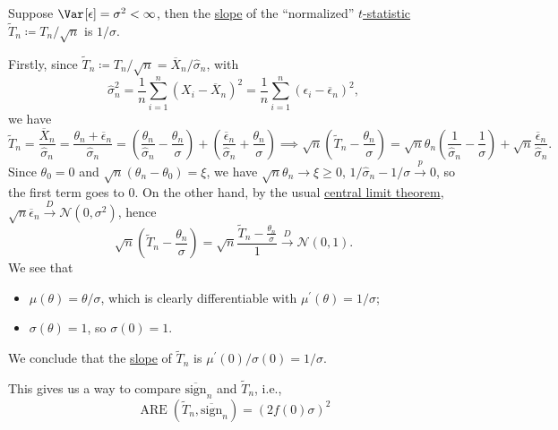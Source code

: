 \begin{eg}[\(t\)-test]
	Suppose \(\Var_{}[\epsilon ] = \sigma ^2 < \infty \), then the \hyperref[def:slope]{slope} of the ``normalized'' \hyperref[def:t-statistic]{\(t\)-statistic} \(\widetilde{T} _n \coloneqq T_n / \sqrt{n}\) is \(1 / \sigma \).
\end{eg}
\begin{explanation}
	Firstly, since \(\widetilde{T} _n \coloneqq T_n / \sqrt{n} = \overline{X} _n / \hat{\sigma} _n\), with
	\[
		\hat{\sigma} _n^2
		= \frac{1}{n} \sum_{i=1}^{n} (X_i - \overline{X} _n)^2
		= \frac{1}{n} \sum_{i=1}^{n} (\epsilon _i - \overline{\epsilon} _n)^2,
	\]
	we have
	\[
		\widetilde{T} _n
		= \frac{\overline{X} _n}{\hat{\sigma} _n}
		= \frac{\theta _n + \overline{\epsilon} _n}{\hat{\sigma} _n}
		= \left( \frac{\theta _n}{\hat{\sigma} _n} - \frac{\theta _n}{\sigma } \right) + \left( \frac{\overline{\epsilon} _n}{\hat{\sigma} _n} + \frac{\theta _n}{\sigma } \right)
		\implies
		\sqrt{n} \left( \widetilde{T} _n - \frac{\theta _n}{\sigma } \right)
		= \sqrt{n} \theta _n \left( \frac{1}{\hat{\sigma} _n} - \frac{1}{\sigma } \right) + \sqrt{n} \frac{\overline{\epsilon} _n}{\hat{\sigma} _n}.
	\]
	Since \(\theta _0 = 0\) and \(\sqrt{n} (\theta _n - \theta _0) = \xi \), we have \(\sqrt{n} \theta _n \to \xi \geq 0\), \(1 / \hat{\sigma} _n - 1 / \sigma \overset{p}{\to} 0\), so the first term goes to \(0\). On the other hand, by the usual \hyperref[thm:CLT]{central limit theorem}, \(\sqrt{n} \overline{\epsilon} _n \overset{D}{\to} \mathcal{N} (0, \sigma ^2)\), hence
	\[
		\sqrt{n} \left( \widetilde{T} _n - \frac{\theta _n}{\sigma } \right)
		= \sqrt{n} \frac{\widetilde{T} _n - \frac{\theta _n}{\sigma }}{1}
		\overset{D}{\to} \mathcal{N} (0, 1).
	\]
	We see that
	\begin{itemize}
		\item \(\mu (\theta ) = \theta / \sigma \), which is clearly differentiable with \(\mu ^{\prime} (\theta ) = 1 / \sigma \);
		\item \(\sigma (\theta ) = 1\), so \(\sigma (0) = 1\).
	\end{itemize}
	We conclude that the \hyperref[def:slope]{slope} of \(\widetilde{T} _n\) is \(\mu ^{\prime} (0) / \sigma (0) = 1 / \sigma \).
\end{explanation}

This gives us a way to compare \(\overline{\mathrm{sign} }_n \) and \(\widetilde{T} _n\), i.e.,
\[
	\operatorname{ARE}(\widetilde{T} _n, \overline{\mathrm{sign}} _n)
	= \left( 2 f(0) \sigma \right) ^2
\]

